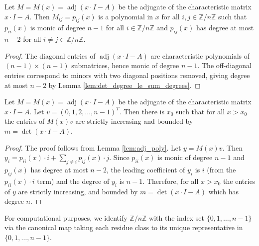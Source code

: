 \begin{lemma}
\label{lem:adj_poly}
Let $M = M(x) = \operatorname{adj}(x\cdot I - A)$ be the adjugate of the characteristic matrix $x\cdot I - A$.
Then $M_{ij} = p_{ij}(x)$ is a polynomial in $x$ for all $i,j\in \mathbb{Z}/n\mathbb{Z}$ such that
$p_{ii}(x)$ is monic of degree $n-1$ for all $i\in \mathbb{Z}/n\mathbb{Z}$ and
$p_{ij}(x)$ has degree at most $n-2$ for all $i\neq j\in \mathbb{Z}/n\mathbb{Z}$.
\end{lemma}

\begin{proof}
The diagonal entries of $\operatorname{adj}(x\cdot I - A)$ are characteristic polynomials of $(n-1) \times (n-1)$ submatrices, 
hence monic of degree $n-1$. The off-diagonal entries correspond to minors with two diagonal positions removed, 
giving degree at most $n-2$ by Lemma \ref{lem:det_degree_le_sum_degrees}.
\end{proof}

\begin{lemma}
\label{lem:adj_poly_strict_increasing}
Let $M = M(x) = \operatorname{adj}(x\cdot I - A)$ be the adjugate of the characteristic matrix $x\cdot I - A$.
Let $v = (0,1,2,\ldots,n-1)^T$. Then there is $x_0$ such that for all $x > x_0$ the entries of $M(x)v$ are strictly increasing and bounded by $m = \det(x\cdot I - A)$.
\end{lemma}

\begin{proof}
The proof follows from Lemma \ref{lem:adj_poly}.
Let $y = M(x)v$. Then $y_i = p_{ii}(x) \cdot i + \sum_{j\neq i} p_{ij}(x) \cdot j$.
Since $p_{ii}(x)$ is monic of degree $n-1$ and $p_{ij}(x)$ has degree at most $n-2$,
the leading coefficient of $y_i$ is $i$ (from the $p_{ii}(x) \cdot i$ term) and the degree of $y_i$ is $n-1$.
Therefore, for all $x > x_0$ the entries of $y$ are strictly increasing, and bounded by $m = \det(x\cdot I - A)$ which has degree $n$.
\end{proof}

\begin{definition}
\label{def:zmodToFin}
\leanok
For computational purposes, we identify $\mathbb{Z}/n\mathbb{Z}$ with the index set $\{0,1,\ldots,n-1\}$ via the canonical map 
taking each residue class to its unique representative in $\{0,1,\ldots,n-1\}$.
\end{definition}

